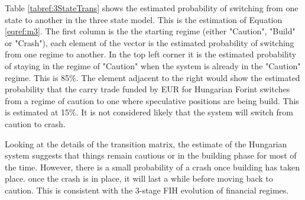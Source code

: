 \documentclass[12pt, a4paper, oneside]{article} %
\begin{document}
Table \ref{tabref:3StateTrans} shows the estimated probability of switching from one state to another in the three state model.  This is the estimation of Equation \ref{eqref:m3}.  The first column is the  the starting regime (either "Caution", "Build" or "Crash"), each element of the vector is the estimated probability of switching from one regime to another. In the top left corner it is the estimated probability of staying in the regime of "Caution" when the system is already in the "Caution" regime.  This is 85\%.  The element adjacent to the right would show the estimated probability that the carry trade funded by EUR for Hungarian Forint switches from a regime of caution to one where speculative positions are being build.  This is estimated at 15\%.  It is not considered likely that the system will switch from caution to crash.  

Looking at the details of the transition matrix, the estimate of the Hungarian system suggests that things remain cautious or in the building phase for most of the time.  However, there is a small probability of a crash once building has taken place. once the crash is in place, it will last a while before moving back to caution. This is consistent with the 3-stage FIH evolution of financial regimes. 
\end{document}
